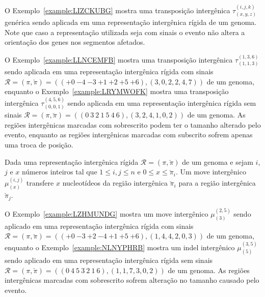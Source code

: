 O Exemplo~\ref{example:LIZCKUBG} mostra uma transposição intergênica $\tau^{(i,j,k)}_{(x,y,z)}$ genérica sendo aplicada em uma representação intergênica rígida de um genoma. Note que caso a representação utilizada seja com sinais o evento não altera a orientação dos genes nos segmentos afetados.



O Exemplo~\ref{example:LLNCEMFB} mostra uma transposição intergênica $\tau^{(1,3,6)}_{(1,1,3)}$ sendo aplicada em uma representação intergênica rígida com sinais $\mathcal{R} = (\pi,\breve\pi) = \allowbreak(({+0}~{-4}~{-3}~{+1}~{+2}~{+5}~{+6}),\allowbreak(3,0,2,2,4,7))$ de um genoma, enquanto o Exemplo~\ref{example:LRYMWOFK} mostra uma transposição intergênica $\tau^{(4,5,6)}_{(0,0,1)}$ sendo aplicada em uma representação intergênica rígida sem sinais $\mathcal{R} = (\pi,\breve\pi) = \allowbreak(({0}~{3}~{2}~{1}~{5}~{4}~{6}),\allowbreak(3,2,4,1,0,2))$ de um genoma. As regiões intergênicas marcadas com sobrescrito podem ter o tamanho alterado pelo evento, enquanto as regiões intergênicas marcadas com subscrito sofrem apenas uma troca de posição.





\begin{definition}
Dada uma representação intergênica rígida $\mathcal{R} = (\pi,\breve\pi)$ de um genoma e sejam $i$, $j$ e $x$ números inteiros tal que $1 \le i, j \le n$ e $0 \le x \le \breve\pi_i$. Um move intergênico $\mu^{(i,j)}_{(x)}$ transfere $x$ nucleotídeos da região intergênica $\breve\pi_i$ para a região intergênica $\breve\pi_{j}$.
\end{definition}

O Exemplo~\ref{example:LZHMUNDG} mostra um move intergênico $\mu^{(2,5)}_{(3)}$ sendo aplicado em uma representação intergênica rígida com sinais $\mathcal{R} = (\pi,\breve\pi) = \allowbreak(({+0}~{-3}~{+2}~{-4}~{+1}~{+5}~{+6}),\allowbreak(1,4,4,2,0,3))$ de um genoma, enquanto o Exemplo~\ref{example:NLNYPHRB} mostra um indel intergênico $\mu^{(3,5)}_{(5)}$ sendo aplicado em uma representação intergênica rígida sem sinais $\mathcal{R} = (\pi,\breve\pi) = \allowbreak(({0}~{4}~{5}~{3}~{2}~{1}~{6}),\allowbreak(1,1,7,3,0,2))$ de um genoma. As regiões intergênicas marcadas com sobrescrito sofrem alteração no tamanho causado pelo evento.





